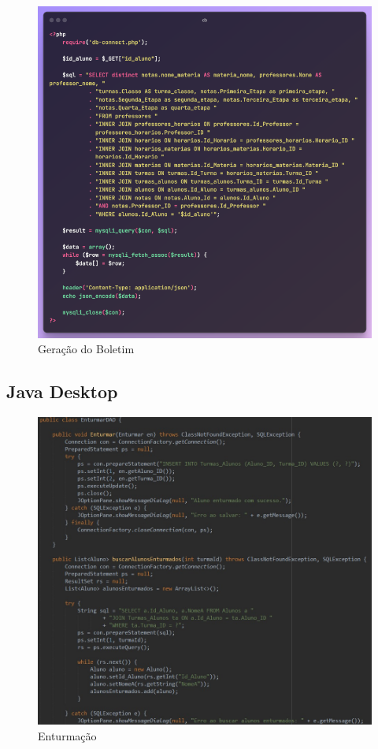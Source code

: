 \documentclass[main.tex]{subfiles}
\begin{document}
\begin{figure}[H]
    \centering
    \includegraphics[scale=0.63]{imagens/code_scrs/10-Boletim}
    \caption{Geração do Boletim}
\end{figure}

\subsection{Java Desktop}
\begin{figure}[H]
    \centering
    \includegraphics[scale=0.65]{imagens/code_scrs/12-enturmar}
    \caption{Enturmação}
\end{figure}
\end{document}
